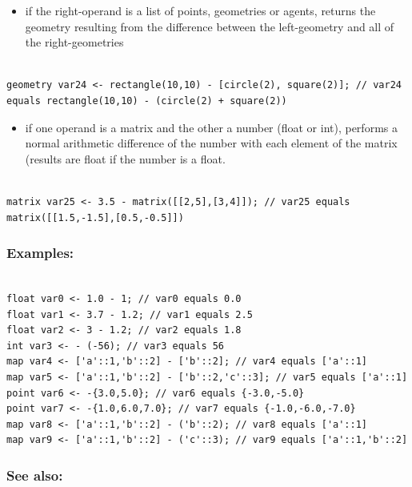 \documentclass[]{book}
\providecommand{\tightlist}{%
  \setlength{\itemsep}{0pt}\setlength{\parskip}{0pt}}
\theoremstyle{definition}
\theoremstyle{definition}
\theoremstyle{definition}
\theoremstyle{remark}
\begin{document}
\begin{itemize}
\tightlist
\item
  if the right-operand is a list of points, geometries or agents,
  returns the geometry resulting from the difference between the
  left-geometry and all of the right-geometries
\end{itemize}

\begin{verbatim}
 
geometry var24 <- rectangle(10,10) - [circle(2), square(2)]; // var24 equals rectangle(10,10) - (circle(2) + square(2))
\end{verbatim}

\begin{itemize}
\tightlist
\item
  if one operand is a matrix and the other a number (float or int),
  performs a normal arithmetic difference of the number with each
  element of the matrix (results are float if the number is a float.
\end{itemize}

\begin{verbatim}
 
matrix var25 <- 3.5 - matrix([[2,5],[3,4]]); // var25 equals matrix([[1.5,-1.5],[0.5,-0.5]])
\end{verbatim}

\subsubsection{Examples:}\label{examples}

\begin{verbatim}
 
float var0 <- 1.0 - 1; // var0 equals 0.0 
float var1 <- 3.7 - 1.2; // var1 equals 2.5 
float var2 <- 3 - 1.2; // var2 equals 1.8 
int var3 <- - (-56); // var3 equals 56 
map var4 <- ['a'::1,'b'::2] - ['b'::2]; // var4 equals ['a'::1] 
map var5 <- ['a'::1,'b'::2] - ['b'::2,'c'::3]; // var5 equals ['a'::1] 
point var6 <- -{3.0,5.0}; // var6 equals {-3.0,-5.0} 
point var7 <- -{1.0,6.0,7.0}; // var7 equals {-1.0,-6.0,-7.0} 
map var8 <- ['a'::1,'b'::2] - ('b'::2); // var8 equals ['a'::1] 
map var9 <- ['a'::1,'b'::2] - ('c'::3); // var9 equals ['a'::1,'b'::2]
\end{verbatim}

\subsubsection{See also:}\label{see-also}
\end{document}

